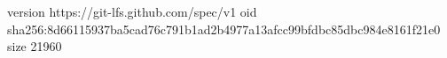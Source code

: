 version https://git-lfs.github.com/spec/v1
oid sha256:8d66115937ba5cad76c791b1ad2b4977a13afcc99bfdbc85dbc984e8161f21e0
size 21960
